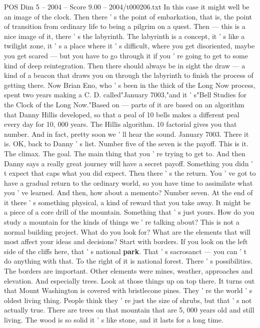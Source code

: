 \begin{textsample}{POS Dim 5 – 2004 – Score 9.00 – 2004/t000206.txt}
In this case it might well be an image of the clock.
Then there ' s the point of embarkation, that is, the point of transition from ordinary life to being a pilgrim on a quest.
Then — this is a nice image of it, there ' s the labyrinth.
The labyrinth is a concept, it ' s like a twilight zone, it ' s a place where it ' s difficult, where you get disoriented, maybe you get scared — but you have to go through it if you ' re going to get to some kind of deep reintegration.
Then there should always be in sight the draw — a kind of a beacon that draws you on through the labyrinth to finish the process of getting there.
Now Brian Eno, who ' s been in the thick of the Long Now process, spent two years making a C.
D. called"January 7003,"and it ' s"Bell Studies for the Clock of the Long Now."Based on — parts of it are based on an algorithm that Danny Hillis developed, so that a peal of 10 bells makes a different peal every day for 10, 000 years.
The Hillis algorithm. 10 factorial gives you that number.
And in fact, pretty soon we ' ll hear the sound.
January 7003.
There it is.
OK, back to Danny ' s list.
Number five of the seven is the payoff.
This is it.
The climax.
The goal.
The main thing that you ' re trying to get to.
And then Danny says a really great journey will have a secret payoff.
Something you didn ' t expect that caps what you did expect.
Then there ' s the return.
You ' ve got to have a gradual return to the ordinary world, so you have time to assimilate what you ' ve learned.
And then, how about a memento?
Number seven.
At the end of it there ' s something physical, a kind of reward that you take away.
It might be a piece of a core drill of the mountain.
Something that ' s just yours.
How do you study a mountain for the kinds of things we ' re talking about?
This is not a normal building project.
What do you look for?
What are the elements that will most affect your ideas and decisions?
Start with borders.
If you look on the left side of the cliffs here, that ' s national \textbf{park}.
That ' s sacrosanct — you can ' t do anything with that.
To the right of it is national forest.
There ' s possibilities.
The borders are important.
Other elements were mines, weather, approaches and elevation.
And especially trees.
Look at those things up on top there.
It turns out that Mount Washington is covered with bristlecone pines.
They ' re the world ' s oldest living thing.
People think they ' re just the size of shrubs, but that ' s not actually true.
There are trees on that mountain that are 5, 000 years old and still living.
The wood is so solid it ' s like stone, and it lasts for a long time.

\end{textsample}
